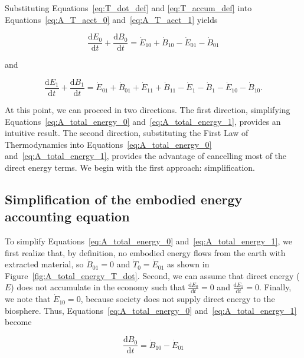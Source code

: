 Substituting Equations~\ref{eq:T_dot_def} and
\ref{eq:T_accum_def} into 
Equations~\ref{eq:A_T_acct_0} and~\ref{eq:A_T_acct_1}
yields

\begin{equation} \label{eq:A_total_energy_0}
	\frac{\mathrm{d}E_{0}}{\mathrm{d}t} 
	+ \frac{\mathrm{d}B_{0}}{\mathrm{d}t} 
	= \dot{E}_{10} 
	+ \dot{B}_{10} 
	- \dot{E}_{01}
	- \dot{B}_{01}
\end{equation}

\noindent and

\begin{equation} \label{eq:A_total_energy_1}
	\frac{\mathrm{d}E_{1}}{\mathrm{d}t} 
	+ \frac{\mathrm{d}B_{1}}{\mathrm{d}t} 
	= \dot{E}_{01} 
	+ \dot{B}_{01} 
	+ \dot{E}_{11}
	+ \dot{B}_{11}
	- \dot{E}_{1}
	- \dot{B}_{1}
	- \dot{E}_{10}
	- \dot{B}_{10}.	
\end{equation}

At this point, we can proceed in two directions.
The first direction, 
simplifying Equations~\ref{eq:A_total_energy_0} 
and~\ref{eq:A_total_energy_1}, 
provides an intuitive result. 
The second direction,
substituting the First Law of Thermodynamics into 
Equations~\ref{eq:A_total_energy_0} 
and~\ref{eq:A_total_energy_1}, 
provides the advantage of cancelling most of the direct energy terms.
We begin with the first approach: simplification.


\subsection{Simplification of the embodied energy accounting equation} %
\label{sec:A_simplified_embodied}

To simplify Equations~\ref{eq:A_total_energy_0} 
and~\ref{eq:A_total_energy_1},
we first realize that, by definition, no embodied energy flows from 
the earth with extracted material, so $\dot{B}_{01} = 0$
and $\dot{T}_{0} = \dot{E}_{01}$ as shown in Figure~\ref{fig:A_total_energy_T_dot}.
Second, we can assume that direct energy ($E$) does not accumulate
in the economy such that 
$\frac{\mathrm{d}E_0}{\mathrm{d}t} = 0$ and
$\frac{\mathrm{d}E_1}{\mathrm{d}t} = 0$.
Finally, we note that $\dot{E}_{10} = 0$, 
because society does not supply direct energy 
to the biosphere. Thus, Equations~\ref{eq:A_total_energy_0}
and~\ref{eq:A_total_energy_1} become

\begin{equation} \label{eq:A_total_energy_0_simp}
	\frac{\mathrm{d}B_{0}}{\mathrm{d}t} 
	= \dot{B}_{10} 
	- \dot{E}_{01}
\end{equation}

